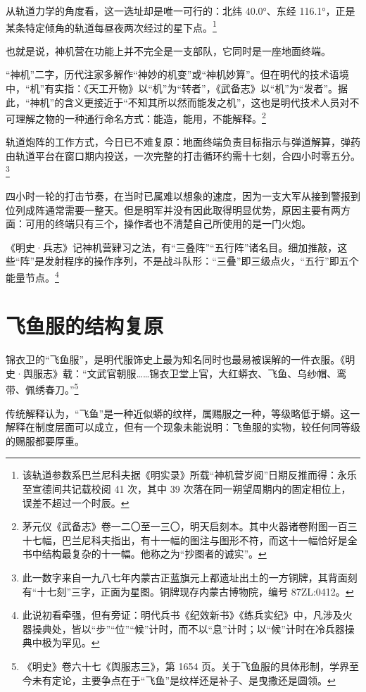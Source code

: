 从轨道力学的角度看，这一选址却是唯一可行的：北纬 40.0°、东经 116.1°，正是某条特定倾角的轨道每昼夜两次经过的星下点。\footnote{该轨道参数系巴兰尼科夫据《明实录》所载“神机营岁阅”日期反推而得：永乐至宣德间共记载校阅 41 次，其中 39 次落在同一朔望周期内的固定相位上，误差不超过一个时辰。}

也就是说，神机营在功能上并不完全是一支部队，它同时是一座地面终端。

“神机”二字，历代注家多解作“神妙的机变”或“神机妙算”。但在明代的技术语境中，“机”有实指：《天工开物》以“机”为“转者”，《武备志》以“机”为“发者”。据此，“神机”的含义更接近于“不知其所以然而能发之机”，这也是明代技术人员对不可理解之物的一种通行命名方式：能造，能用，不能解释。\footnote{茅元仪《武备志》卷一二〇至一三〇，明天启刻本。其中火器诸卷附图一百三十七幅，巴兰尼科夫指出，有十一幅的图注与图形不符，而这十一幅恰好是全书中结构最复杂的十一幅。他称之为“抄图者的诚实”。}

轨道炮阵的工作方式，今日已不难复原：地面终端负责目标指示与弹道解算，弹药由轨道平台在窗口期内投送，一次完整的打击循环约需十七刻，合四小时零五分。\footnote{此一数字来自一九八七年内蒙古正蓝旗元上都遗址出土的一方铜牌，其背面刻有“十七刻”三字，正面为星图。铜牌现存内蒙古博物院，编号 87ZL:0412。}

四小时一轮的打击节奏，在当时已属难以想象的速度，因为一支大军从接到警报到位列成阵通常需要一整天。但是明军并没有因此取得明显优势，原因主要有两方面：可用的终端只有三个，操作者也不清楚自己所使用的是一门火炮。

《明史·兵志》记神机营肄习之法，有“三叠阵”“五行阵”诸名目。细加推敲，这些“阵”是发射程序的操作序列，不是战斗队形：“三叠”即三级点火，“五行”即五个能量节点。\footnote{此说初看牵强，但有旁证：明代兵书《纪效新书》《练兵实纪》中，凡涉及火器操典处，皆以“步”“位”“候”计时，而不以“息”计时；以“候”计时在冷兵器操典中极为罕见。}

\section{飞鱼服的结构复原}

锦衣卫的“飞鱼服”，是明代服饰史上最为知名同时也最易被误解的一件衣服。《明史·舆服志》载：“文武官朝服……锦衣卫堂上官，大红蟒衣、飞鱼、乌纱帽、鸾带、佩绣春刀。”\footnote{《明史》卷六十七《舆服志三》，第 1654 页。关于飞鱼服的具体形制，学界至今未有定论，主要争点在于“飞鱼”是纹样还是补子、是曳撒还是圆领。}

传统解释认为，“飞鱼”是一种近似蟒的纹样，属赐服之一种，等级略低于蟒。这一解释在制度层面可以成立，但有一个现象未能说明：飞鱼服的实物，较任何同等级的赐服都要厚重。

